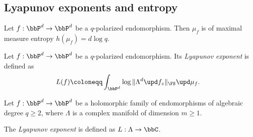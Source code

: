 \subsection[status=draft,tag=0000000,label=\labelNFM{subsec:lyapunov-exponent-and-entropy}]{Lyapunov exponents and entropy}


\begin{proposition}[label=\labelNFM{prop:equilibrium-measure-is-of-maximal-entropy}, status=draft, tag=0000000]
	Let $f: \bbP^d \to \bbP^d$ be a $q$-polarized endomorphism.
	Then $\mu_f$ is of maximal measure entropy $h(\mu_f) = d\log q$.
	\Yang{}
\end{proposition}


\begin{definition}[label=\labelNFM{def:lyapunov-exponent}, status=draft, tag=0000000]
	Let $f: \bbP^d \to \bbP^d$ be a $q$-polarized endomorphism.
	Its \emph{Lyapunov exponent} is defined as
	\[ L(f) \coloneqq \int_{\bbP^d} \log \|\Lambda^d \upd f_z \|_{\FS} \upd \mu_f. \]


	Let $f:\bbP^d \to \bbP^d$ be a holomorphic family of endomorphisms of algebraic degree $q \geq 2$, where $\Lambda$ is a complex manifold of dimension $m\geq1$.



	The \emph{Lyapunov exponent} is defined as $L: \Lambda \to \bbC$.
	\Yang{}
\end{definition}
